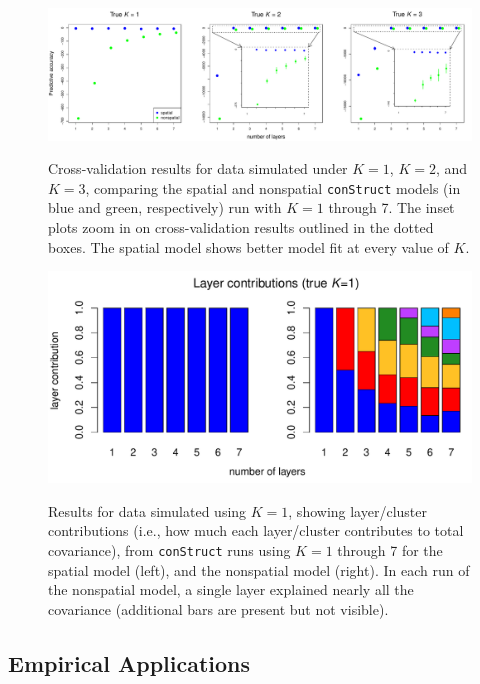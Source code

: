 \documentclass[10pt,letterpaper]{article}
\begin{document}
\begin{figure}
	\centering
		{\includegraphics[width=\textwidth]{figs/sims/sim_xvals.pdf}}
	\caption{
	Cross-validation results for data simulated under $K=1$, $K=2$, and $K=3$, 
	comparing the spatial and nonspatial \texttt{conStruct} models 
	(in blue and green, respectively) run with $K=1$ through 7.  
	The inset plots zoom in on cross-validation results outlined in the dotted boxes.
    The spatial model shows better model fit at every value of $K$.
    }\label{sim_xvals}
\end{figure}

\begin{figure}
	\centering
		{\includegraphics[width=\textwidth]{figs/sims/simK1_laycon_barplots.pdf}}
		\caption{
            Results for data simulated using $K=1$, showing
            layer/cluster contributions (i.e., how much each layer/cluster contributes to total covariance),
            from \texttt{conStruct} runs using $K = 1$ through 7 
			for the spatial model (left), and the nonspatial model (right).
			In each run of the nonspatial model, a single layer explained nearly all the covariance
            (additional bars are present but not visible).
		}\label{simK1_laycon}
\end{figure}


\subsection*{Empirical Applications}
\end{document}

